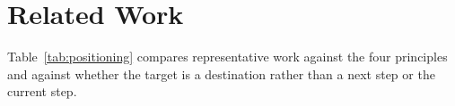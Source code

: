 \documentclass[sigconf]{acmart}
\begin{document}



\section{Related Work}
\label{sec:related}

Table~\ref{tab:positioning} compares representative work against the four principles and against whether the target is a destination rather than a next step or the current step.
\end{document}
